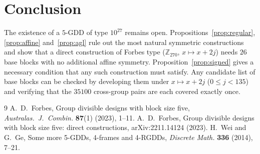 \documentclass[11pt]{article}
\theoremstyle{remark}
\newcommand{\Z}{\mathbb{Z}}
\begin{document}
\section{Conclusion}

The existence of a $5$-GDD of type $10^{27}$ remains open.  Propositions~\ref{prop:regular},
\ref{prop:affine} and~\ref{prop:agl} rule out the most natural symmetric constructions and show that
a direct construction of Forbes type ($\Z_{270}$, $x\mapsto x+2j$) needs $26$ base blocks with no
additional affine symmetry.  Proposition~\ref{prop:signed} gives a necessary condition that any such
construction must satisfy.  Any candidate list of base blocks can be checked by developing them under
$x\mapsto x+2j$ ($0\le j<135$) and verifying that the $35100$ cross-group pairs are each covered exactly
once.

\begin{thebibliography}{9}
A.~D.~Forbes, Group divisible designs with block size five,
\emph{Australas.\ J.\ Combin.} \textbf{87}(1) (2023), 1--11.
A.~D.~Forbes, Group divisible designs with block size five: direct constructions,
arXiv:2211.14124 (2023).
H.~Wei and G.~Ge, Some more 5-GDDs, 4-frames and 4-RGDDs,
\emph{Discrete Math.} \textbf{336} (2014), 7--21.
\end{thebibliography}
\end{document}
